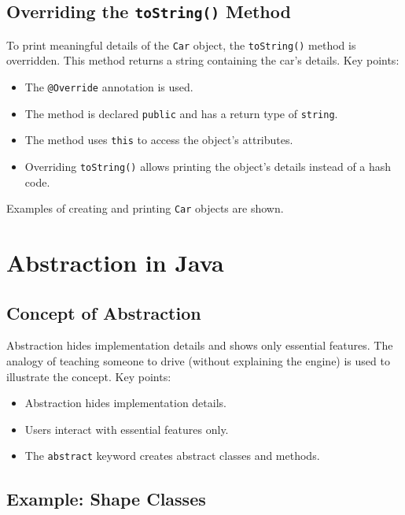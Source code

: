 \documentclass{article}
\begin{document}
\subsection{Overriding the \texttt{toString()} Method}

To print meaningful details of the \texttt{Car} object, the \texttt{toString()} method is overridden. This method returns a string containing the car's details. Key points:

\begin{itemize}
    \item The \texttt{@Override} annotation is used.
    \item The method is declared \texttt{public} and has a return type of \texttt{string}.
    \item The method uses \texttt{this} to access the object's attributes.
    \item Overriding \texttt{toString()} allows printing the object's details instead of a hash code.
\end{itemize}

Examples of creating and printing \texttt{Car} objects are shown.


\section{Abstraction in Java}

\subsection{Concept of Abstraction}

Abstraction hides implementation details and shows only essential features.  The analogy of teaching someone to drive (without explaining the engine) is used to illustrate the concept. Key points:

\begin{itemize}
    \item Abstraction hides implementation details.
    \item Users interact with essential features only.
    \item The \texttt{abstract} keyword creates abstract classes and methods.
\end{itemize}

\subsection{Example: Shape Classes}
\end{document}
